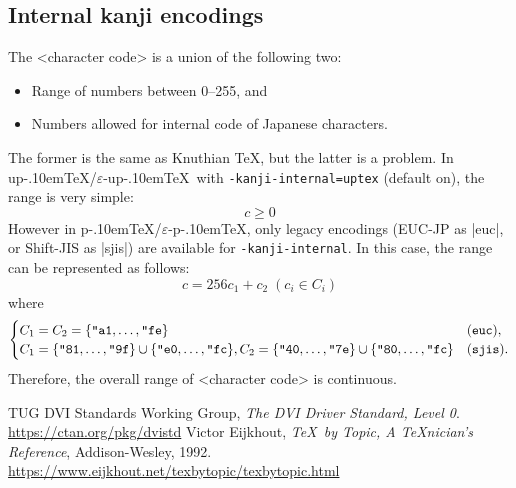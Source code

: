 \documentclass[a4paper,11pt]{article}
\let\emph=\origemph
\def\code#1{\texttt{#1}}
\def\epTeX{$\varepsilon$-\pTeX}\def\eTeX{$\varepsilon$-\TeX}
\def\eupTeX{$\varepsilon$-\upTeX}\def\upTeX{u\pTeX}
\def\pTeX{p\kern-.10em\TeX}
\begin{document}

\subsection{Internal kanji encodings}\label{kanji-internal}

The <character code> is a union of the following two:
\begin{itemize}
 \item Range of numbers between 0--255, and
 \item Numbers allowed for internal code of Japanese characters.
\end{itemize}
The former is the same as Knuthian \TeX, but the latter is a problem.
In \upTeX/\eupTeX\ with \code{-kanji-internal=uptex} (default on),
the range is very simple:
\[ c \ge 0 \]
However in \pTeX/\epTeX, only legacy encodings (EUC-JP as |euc|,
or Shift-JIS as |sjis|) are available for \code{-kanji-internal}.
In this case, the range can be represented as follows:
\[
  c = 256c_1+c_2 \; (c_i\in C_i)
\]
where
\[
  \begin{cases}
    C_1=C_2=\{\hex{a1},\dots,\hex{fe}\} & (\mathtt{euc}), \\
    C_1=\{\hex{81},\dots,\hex{9f}\}\cup\{\hex{e0},\dots,\hex{fc}\},
    C_2=\{\hex{40},\dots,\hex{7e}\}\cup\{\hex{80},\dots,\hex{fc}\} & (\mathtt{sjis}).
  \end{cases}
\]
Therefore, the overall range of <character code> is \emph{not} continuous.

\newpage

\begin{thebibliography}{99}
  TUG DVI Standards Working Group,
  \textit{The DVI Driver Standard, Level 0}.\\
  \url{https://ctan.org/pkg/dvistd}
  Victor Eijkhout, \textit{\TeX\ by Topic, A \TeX nician's Reference},
  Addison-Wesley, 1992.\\
  \url{https://www.eijkhout.net/texbytopic/texbytopic.html}
\end{thebibliography}

\newpage
\printindex
\end{document}
